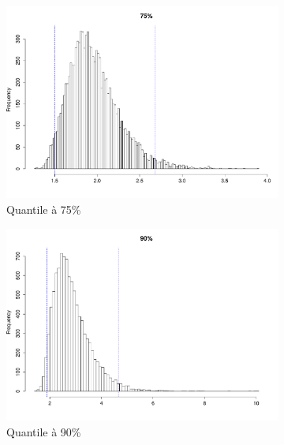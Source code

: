 \documentclass{article}
\renewcommand*{\(}{ \left( }
\renewcommand*{\)}{ \right) }
\begin{document}
\begin{figure}[H]
    \centering
    \begin{subfigure}[t]{0.3\textwidth}
        \includegraphics[width = \linewidth]{img/BootstrapParamEMV-75-30.pdf}
        \caption{Quantile à 75\%}
        \label{fig:BPEMV75} %
    \end{subfigure}%
    \begin{subfigure}[t]{0.3\textwidth}
        \includegraphics[width = \linewidth]{img/BootstrapParamEMV-90-30.pdf}
        \caption{Quantile à 90\%}
        \label{fig:BPEMV90}
    \end{subfigure}%
    \begin{subfigure}[t]{0.3\textwidth}

\end{subfigure}
\end{figure}
\end{document}

